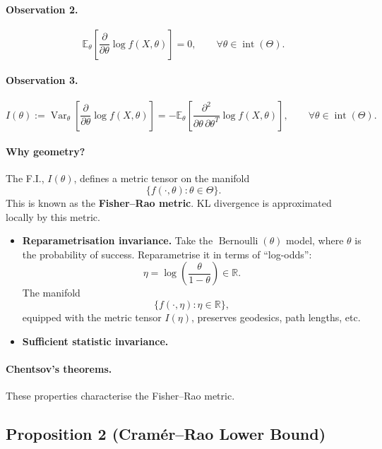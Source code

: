 \documentclass[11pt,a4paper]{article}
\begin{document}
\paragraph{Observation 2.}
\[
\mathbb{E}_{\theta}
\left[
\frac{\partial}{\partial\theta}\log f(X,\theta)
\right]
=0,
\qquad
\forall\theta\in\operatorname{int}(\Theta).
\]

\paragraph{Observation 3.}
\[
I(\theta)
:=
\operatorname{Var}_{\theta}
\left[
\frac{\partial}{\partial\theta}\log f(X,\theta)
\right]
=
-\mathbb{E}_{\theta}
\left[
\frac{\partial^2}{\partial\theta\,\partial\theta^{T}}
\log f(X,\theta)
\right],
\qquad
\forall\theta\in\operatorname{int}(\Theta).
\]

\paragraph{Why geometry?}
The F.I., $I(\theta)$, defines a metric tensor on the manifold
\[
\{f(\cdot,\theta):\theta\in\Theta\}.
\]
This is known as the \textbf{Fisher--Rao metric}.
KL divergence is approximated locally by this metric.

\begin{itemize}
    \item \textbf{Reparametrisation invariance.}
    Take the $\operatorname{Bernoulli}(\theta)$ model, where $\theta$
    is the probability of success. Reparametrise it in terms of
    ``log-odds'':
    \[
    \eta=\log\left(\frac{\theta}{1-\theta}\right)\in\mathbb{R}.
    \]
    The manifold
    \[
    \{f(\cdot,\eta):\eta\in\mathbb{R}\},
    \]
    equipped with the metric tensor $I(\eta)$, preserves geodesics,
    path lengths, etc.

    \item \textbf{Sufficient statistic invariance.}
\end{itemize}

\paragraph{Chentsov's theorems.}
These properties characterise the Fisher--Rao metric.

\subsection*{Proposition 2 (Cram\'er--Rao Lower Bound)}
\end{document}
